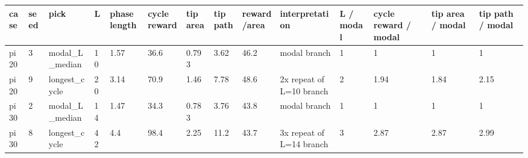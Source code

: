 \begin{tabular}{llllllllllllll}
\toprule
case & seed & pick & L & phase length & cycle reward & tip area & tip path & reward/area & interpretation & L / modal & cycle reward / modal & tip area / modal & tip path / modal \\
\midrule
pi20 & 3 & modal\_L\_median & 10 & 1.57 & 36.6 & 0.793 & 3.62 & 46.2 & modal branch & 1 & 1 & 1 & 1 \\
pi20 & 9 & longest\_cycle & 20 & 3.14 & 70.9 & 1.46 & 7.78 & 48.6 & 2x repeat of L=10 branch & 2 & 1.94 & 1.84 & 2.15 \\
pi30 & 2 & modal\_L\_median & 14 & 1.47 & 34.3 & 0.783 & 3.76 & 43.8 & modal branch & 1 & 1 & 1 & 1 \\
pi30 & 8 & longest\_cycle & 42 & 4.4 & 98.4 & 2.25 & 11.2 & 43.7 & 3x repeat of L=14 branch & 3 & 2.87 & 2.87 & 2.99 \\
\bottomrule
\end{tabular}
